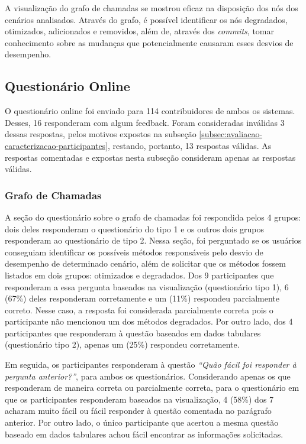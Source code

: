 A visualização do grafo de chamadas se mostrou eficaz na disposição dos nós dos cenários analisados. Através do grafo, é possível identificar os nós degradados, otimizados, adicionados e removidos, além de, através dos \textit{commits}, tomar conhecimento sobre as mudanças que potencialmente causaram esses desvios de desempenho.

\FloatBarrier

\subsection{Questionário Online} \label{subsec:avaliacao-questionario-online}

O questionário online foi enviado para 114 contribuidores de ambos os sistemas. Desses, 16 responderam com algum feedback. Foram consideradas inválidas 3 dessas respostas, pelos motivos expostos na subseção \ref{subsec:avaliacao-caracterizacao-participantes}, restando, portanto, 13 respostas válidas. As respostas comentadas e expostas nesta subseção consideram apenas as respostas válidas.

\subsubsection{Grafo de Chamadas}

A seção do questionário sobre o grafo de chamadas foi respondida pelos 4 grupos: dois deles responderam o questionário do tipo 1 e os outros dois grupos responderam ao questionário de tipo 2. Nessa seção, foi perguntado se os usuários conseguiam identificar os possíveis métodos responsáveis pelo desvio de desempenho de determinado cenário, além de solicitar que os métodos fossem listados em dois grupos: otimizados e degradados. Dos 9 participantes que responderam a essa pergunta baseados na visualização (questionário tipo 1), 6 (67\%) deles responderam corretamente e um (11\%) respondeu parcialmente correto. Nesse caso, a resposta foi considerada parcialmente correta pois o participante não mencionou um dos métodos degradados. Por outro lado, dos 4 participantes que responderam à questão baseados em dados tabulares (questionário tipo 2), apenas um (25\%) respondeu corretamente.

Em seguida, os participantes responderam à questão \textit{``Quão fácil foi responder à pergunta anterior?''}, para ambos os questionários. Considerando apenas os que responderam de maneira correta ou parcialmente correta, para o questionário em que os participantes responderam baseados na visualização, 4 (58\%) dos 7 acharam muito fácil ou fácil responder à questão comentada no parágrafo anterior. Por outro lado, o único participante que acertou a mesma questão baseado em dados tabulares achou fácil encontrar as informações solicitadas.

